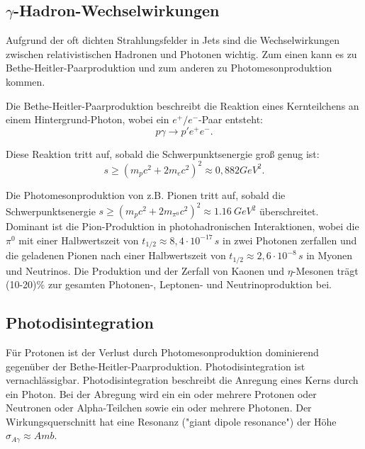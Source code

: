 \subsection{$\gamma$-Hadron-Wechselwirkungen}
Aufgrund der oft dichten Strahlungsfelder in Jets sind die Wechselwirkungen zwischen relativistischen Hadronen und Photonen wichtig.
Zum einen kann es zu Bethe-Heitler-Paarproduktion und zum anderen zu Photomesonproduktion kommen.\cite{RelativisticJets}

Die Bethe-Heitler-Paarproduktion beschreibt die Reaktion eines Kernteilchens an einem Hintergrund-Photon, wobei ein $e^+/e^-$-Paar entsteht:
\begin{equation}
 p \gamma \rightarrow p' e^+ e^-.
\end{equation}

Diese Reaktion tritt auf, sobald die Schwerpunktsenergie groß genug ist:
\begin{equation}
 s \geq (m_p c^2 +2 m_e c^2)^2 \approx 0,882\si{GeV^2}.
\end{equation}

Die Photomesonproduktion von z.B. Pionen tritt auf, sobald die Schwerpunktsenergie $s \geq (m_p c^2 +2 m_{\pi^0} c^2)^2 \approx \SI{1,16}{GeV^2}$ überschreitet.
Dominant ist die Pion-Produktion in photohadronischen Interaktionen, wobei die $\pi^0$ mit einer Halbwertszeit von $t_{1/2}\approx 8,4\cdot 10^{-17}\,\si{s}$ in zwei Photonen zerfallen und die geladenen Pionen nach einer Halbwertszeit von $t_{1/2}\approx 2,6\cdot 10^{-8}\,\si{s}$ in Myonen und Neutrinos.
Die Produktion und der Zerfall von Kaonen und $\eta$-Mesonen trägt (10-20)\% zur gesamten Photonen-, Leptonen- und Neutrinoproduktion bei.\cite{RelativisticJets}

\subsection{Photodisintegration}
Für Protonen ist der Verlust durch Photomesonproduktion dominierend gegenüber der Bethe-Heitler-Paarproduktion. 
Photodisintegration ist vernachlässigbar.
Photodisintegration beschreibt die Anregung eines Kerns durch ein Photon.
Bei der Abregung wird ein ein oder mehrere Protonen oder Neutronen oder Alpha-Teilchen sowie ein oder mehrere Photonen.
Der Wirkungsquerschnitt hat eine Resonanz ("giant dipole resonance") der Höhe $\sigma_{A\gamma}\approx A \si{mb}$.\cite{RelativisticJets}

